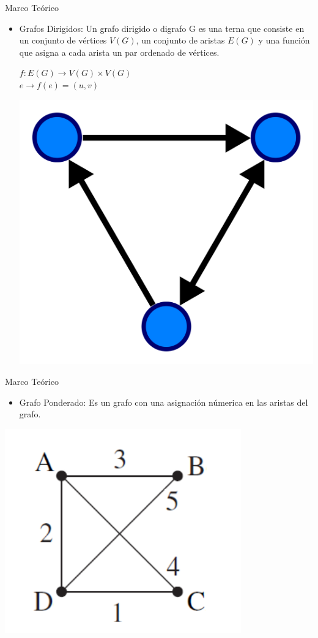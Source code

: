 \documentclass{beamer}
\begin{document}
\begin{frame}{Marco Teórico}

    \begin{itemize}
        \item Grafos Dirigidos:
        Un grafo dirigido o digrafo G es una terna que consiste en un conjunto de vértices $V(G)$, un conjunto de aristas $E(G)$ y una función que asigna a cada arista un par ordenado de vértices.\\
        \begin{center}
            $f : E(G) \rightarrow V(G) \times V(G)$ \\
            $e \rightarrow f(e) = (u, v)$
        \end{center}
    \begin{center}
            \includegraphics[width=.3\textwidth]{g1.png}
    \end{center}
    \end{itemize}

\end{frame}

\begin{frame}{Marco Teórico}
    \begin{itemize}
        \item Grafo Ponderado:
        Es un grafo con una asignación númerica en las aristas del grafo.
    \end{itemize}
    \begin{center}
        \includegraphics[width=.4\textwidth]{g2.png}
    \end{center}
\end{frame}
\end{document}
